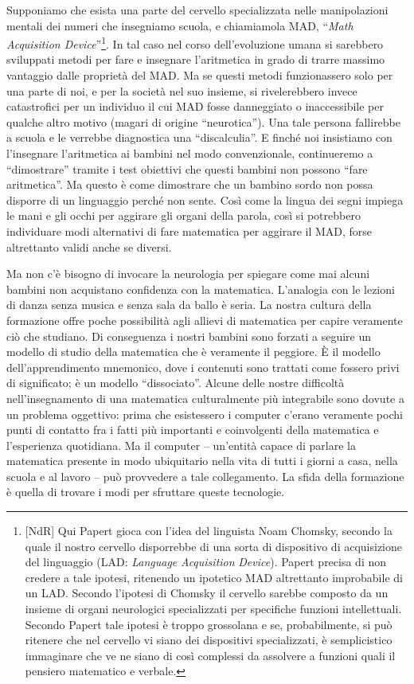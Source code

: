 Supponiamo che esista una parte del cervello specializzata nelle manipolazioni mentali dei numeri che insegniamo scuola, e chiamiamola MAD, “\textit{Math Acquisition Device}”\footnote{[NdR] Qui Papert gioca con l'idea del linguista Noam Chomsky, secondo la quale il nostro cervello disporrebbe di una sorta di dispositivo di acquisizione del linguaggio (LAD: \textit{Language} \textit{Acquisition} \textit{Device}). Papert precisa di non credere a tale ipotesi, ritenendo un ipotetico MAD altrettanto improbabile di un LAD. Secondo l'ipotesi di Chomsky il cervello sarebbe composto da un insieme di organi neurologici specializzati per specifiche funzioni intellettuali. Secondo Papert tale ipotesi è troppo grossolana e se, probabilmente, si può ritenere che nel cervello vi siano dei dispositivi specializzati, è semplicistico immaginare che ve ne siano di così complessi da assolvere a funzioni quali il pensiero matematico e verbale.}. In tal caso nel corso dell'evoluzione umana si sarebbero sviluppati metodi per fare e insegnare l'aritmetica in grado di trarre massimo vantaggio dalle proprietà del MAD. Ma se questi metodi funzionassero solo per una parte di noi, e per la società nel suo insieme, si rivelerebbero invece catastrofici per un individuo il cui MAD fosse danneggiato o inaccessibile per qualche altro motivo (magari di origine “neurotica”). Una tale persona fallirebbe a scuola e le verrebbe diagnostica una “discalculia”. E finché noi insistiamo con l'insegnare l'aritmetica ai bambini nel modo convenzionale, continueremo a “dimostrare” tramite i test obiettivi che questi bambini non  possono “fare aritmetica”. Ma questo è come dimostrare che un bambino sordo non possa disporre di un linguaggio perché non sente. Così come la lingua dei segni impiega le mani e gli occhi per aggirare gli organi della parola, così si potrebbero individuare modi alternativi di fare matematica per aggirare il MAD, forse altrettanto validi anche se diversi. 

Ma non c'è bisogno di invocare la neurologia per spiegare come mai alcuni bambini non acquistano confidenza con la matematica. L'analogia con le lezioni di danza senza musica e senza sala da ballo è seria. La nostra cultura della formazione offre poche possibilità agli allievi di matematica per capire veramente ciò che studiano. Di conseguenza i nostri bambini sono forzati a seguire un modello di studio della matematica che è veramente il peggiore. È il modello dell'apprendimento mnemonico, dove i contenuti sono trattati come fossero privi di significato; è un modello “dissociato”. Alcune delle nostre difficoltà nell'insegnamento di una matematica culturalmente più integrabile sono dovute a un problema oggettivo: prima che esistessero i computer c'erano veramente pochi punti di contatto fra i fatti più importanti e coinvolgenti della matematica e l'esperienza quotidiana. Ma il computer – un'entità capace di parlare la matematica presente in modo ubiquitario nella vita di tutti i giorni a casa, nella scuola e al lavoro – può provvedere a tale collegamento. La sfida della formazione è quella di trovare i modi per sfruttare queste tecnologie.

